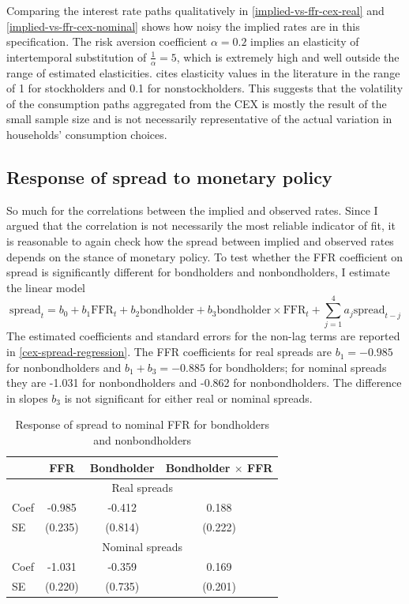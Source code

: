 Comparing the interest rate paths qualitatively in \autoref{implied-vs-ffr-cex-real} and \autoref{implied-vs-ffr-cex-nominal} shows how noisy the implied rates are in this specification. The risk aversion coefficient $\alpha = 0.2$ implies an elasticity of intertemporal substitution of $\frac{1}{\alpha} = 5$, which is extremely high and well outside the range of estimated elasticities. \cite{guvenen06} cites elasticity values in the literature in the range of 1 for stockholders and 0.1 for nonstockholders. This suggests that the volatility of the consumption paths aggregated from the CEX is mostly the result of the small sample size and is not necessarily representative of the actual variation in households' consumption choices.



\subsection{Response of spread to monetary policy}
So much for the correlations between the implied and observed rates. Since I argued that the correlation is not necessarily the most reliable indicator of fit, it is reasonable to again check how the spread between implied and observed rates depends on the stance of monetary policy. To test whether the FFR coefficient on spread is significantly different for bondholders and nonbondholders, I estimate the linear model
\begin{equation}
\label{spread-ffr-bondholder-regression}
\mathrm{spread}_t = b_0 + b_1 \mathrm{FFR}_t + b_2 \mathrm{bondholder} + b_3 \mathrm{bondholder} \times \mathrm{FFR}_t + \sum_{j=1}^4 a_j \mathrm{spread}_{t-j}
\end{equation}
The estimated coefficients and standard errors for the non-lag terms are reported in \autoref{cex-spread-regression}. The FFR coefficients for real spreads are $b_1 = -0.985$ for nonbondholders and $b_1 + b_3 = -0.885$ for bondholders; for nominal spreads they are -1.031 for nonbondholders and -0.862 for nonbondholders. The difference in slopes $b_3$ is not significant for either real or nominal spreads.

\begin{table}[b]
\centering
\caption{Response of spread to nominal FFR for bondholders and nonbondholders}
\label{cex-spread-regression}
\begin{tabular}{lccc} \hline
& FFR & Bondholder & Bondholder $\times$ FFR \\ \hline
\multicolumn{4}{c}{Real spreads} \\ \hline
Coef & -0.985  & -0.412  & 0.188 \\
SE   & (0.235) & (0.814) & (0.222) \\ \hline
\multicolumn{4}{c}{Nominal spreads} \\ \hline
Coef & -1.031  & -0.359  & 0.169 \\
SE   & (0.220) & (0.735) & (0.201) \\ \hline
\end{tabular}
\end{table}

